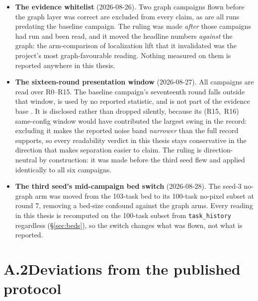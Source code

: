 \begin{itemize}
  \item \textbf{The evidence whitelist} (2026-08-26). Two graph campaigns
        flown before the graph layer was correct are excluded from every
        claim, as are all runs predating the baseline campaign. The ruling
        was made \emph{after} those campaigns had run and been read, and it
        moved the headline numbers \emph{against} the graph: the
        arm-comparison of localization lift that it invalidated was the
        project's most graph-favourable reading. Nothing measured on them
        is reported anywhere in this thesis.
  \item \textbf{The sixteen-round presentation window} (2026-08-27). All
        campaigns are read over R0--R15. The baseline campaign's
        seventeenth round falls outside that window, is used by no
        reported statistic, and is not part of the evidence base
        . It is disclosed rather than dropped silently, because its
        \mbox{(R15, R16)} same-config window would have contributed the
        largest swing in the record: excluding it makes the reported
        noise band \emph{narrower} than the full record supports, so
        every readability verdict in this thesis stays conservative in
        the direction that makes separation easier to claim. The
        ruling is direction-neutral by construction: it was made before the
        third seed flew and applied identically to all six campaigns.
  \item \textbf{The third seed's mid-campaign bed switch} (2026-08-28). The
        seed-3 no-graph arm was moved from the 103-task bed to its 100-task
        no-pixel subset at round 7, removing a bed-size confound against
        the graph arms. Every reading in this thesis is recomputed on the
        100-task subset from \texttt{task\_history} regardless
        (\S\ref{sec:beds}), so the switch changes what was flown, not what
        is reported.
\end{itemize}

\section*{A.2\quad Deviations from the published protocol}

